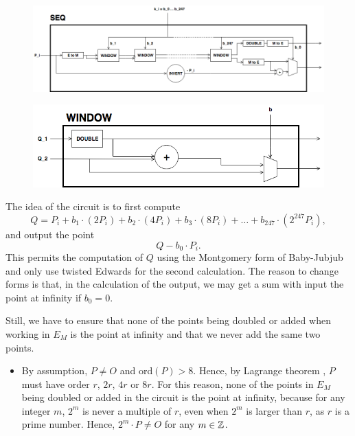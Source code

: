 \begin{enumerate}
	\begin{figure}[h]
		\centering
		\includegraphics[scale=0.43]{figures/multiplication-SEQ.png}\\
		\vspace{0.5cm}
		
		\includegraphics[scale=0.45]{figures/multiplication-SEQ-window.png}
		\vspace{0.3cm}
	\end{figure}

	The idea of the circuit is to first compute %
		$$	Q = P_i + b_1 \cdot (2P_i) + b_2 \cdot (4P_i) 
				+ b_3 \cdot (8P_i) + \dots + b_{247} \cdot (2^{247}P_i), $$
	and output the point
		$$ Q - b_0 \cdot P_i. $$
	This permits the computation of $Q$ using the Montgomery form of Baby-Jubjub and only use twisted Edwards for the second calculation. The reason to change forms is that, in the calculation of the output, we may get a sum with input the point at infinity if $b_0 = 0$. 

	Still, we have to ensure that none of the points being doubled or added when working in $E_M$ is the point at infinity and that we never add the same two points. 

	\begin{itemize}
		
		\item By assumption, $P\not= O$ and ord$(P)>8$. Hence, by Lagrange theorem {\cite[Corollary 4.12]{lagrange}}, $P$ must have order $r$, $2r$, $4r$ or $8r$. 
		For this reason, none of the points in $E_M$ being doubled or added in the circuit is the point at infinity, because for any integer $m$,  $2^m$ is never a multiple of $r$, even when $2^m$ is larger than $r$, as $r$ is a prime number. Hence, $2^m \cdot P \not= O$ for any $m\in\mathbb{Z}$.		


\end{itemize}
\end{enumerate}
